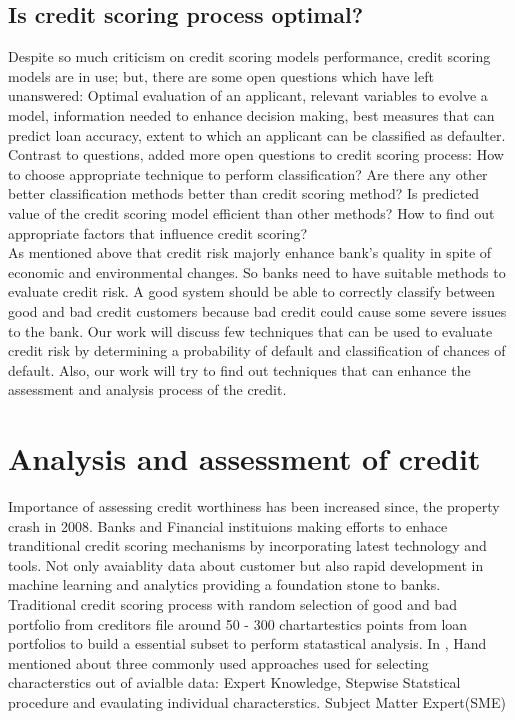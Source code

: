 {\subsection{Is credit scoring process optimal?}\label{C.optimal}
\citep{al2002credit} Despite so much criticism on credit scoring models performance, credit scoring models are in use; but, there are some open questions which have left unanswered: Optimal evaluation of an applicant, relevant variables to evolve a model, information needed to enhance decision making, best measures that can predict loan accuracy, extent to which an applicant can be classified as defaulter.\\

Contrast to \citet{al2002credit} questions, \citet{abdou2009credit} added more open questions to credit scoring process: How to choose appropriate technique to perform classification? Are there any other better classification methods better than credit scoring method? Is predicted value of the credit scoring model efficient than other methods? How to find out appropriate factors that influence credit scoring?\\

As mentioned above that credit risk majorly enhance bank's quality in spite of economic and environmental changes. So banks need to have suitable methods to evaluate credit risk. A good system should be able to correctly classify between good and bad credit customers because bad credit could cause some severe issues to the bank. Our work will discuss few techniques that can be used to evaluate credit risk by determining a probability of default and classification of chances of default. Also, our work will try to find out techniques that can enhance the assessment and analysis process of the credit.

\section{Analysis and assessment of credit}\label{tech.crisk}

Importance of assessing credit worthiness has been increased since, the property crash in 2008. Banks and Financial instituions making efforts to enhace tranditional credit scoring mechanisms by incorporating latest technology and tools. Not only avaiablity data about customer but also rapid development in machine learning and analytics providing a foundation stone to banks. \\

Traditional credit scoring process with random selection of good and bad portfolio from creditors file around 50 - 300 \citet{capon1982credit} chartartestics points from loan portfolios to build a essential subset to perform statastical analysis. In \citep{10.2307/2983268}, Hand mentioned about three commonly used approaches used for selecting characterstics out of avialble data: Expert Knowledge, Stepwise Statstical procedure and evaulating individual characterstics. Subject Matter Expert(SME) \\

}
